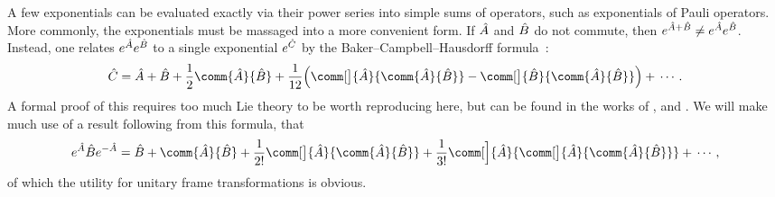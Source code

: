 A few exponentials can be evaluated exactly via their power series into simple sums of operators, such as exponentials of Pauli operators.
More commonly, the exponentials must be massaged into a more convenient form.
If $\hat{A}$ and $\hat{B}$ do not commute, then $e^{\hat{A} + \hat{B}} \ne e^{\hat{A}}e^{\hat{B}}$.
Instead, one relates $e^{\hat{A}}e^{\hat{B}}$ to a single exponential $e^{\hat{C}}$ by the Baker--Campbell--Hausdorff formula~\cite{Bonfiglioli2012}:
\begin{equation}
\op C = \op A + \op B + \frac12\comm{\op A}{\op B} + \frac1{12}\Bigl(\comm[\big]{\op A}{\comm{\op A}{\op B}} - \comm[\big]{\op B}{\comm{\op A}{\op B}}\Bigr) +\,\dotsb.
\end{equation}
A formal proof of this requires too much Lie theory to be worth reproducing here, but can be found in the works of \citet{Bonfiglioli2012}, and \citet{Hall2015}.
We will make much use of a result following from this formula, that
\begin{equation}\label{eq:qi-bch-lemma}
e^{\op A}\op B e^{-\op A} =
    \op B + \comm{\op A}{\op B}
    + \frac1{2!}\comm[\big]{\op A}{\comm{\op A}{\op B}}
    + \frac1{3!}\comm[\Big]{\op A}{\comm[\big]{\op A}{\comm{\op A}{\op B}}}
    +\,\dotsb,
\end{equation}
of which the utility for unitary frame transformations is obvious.


